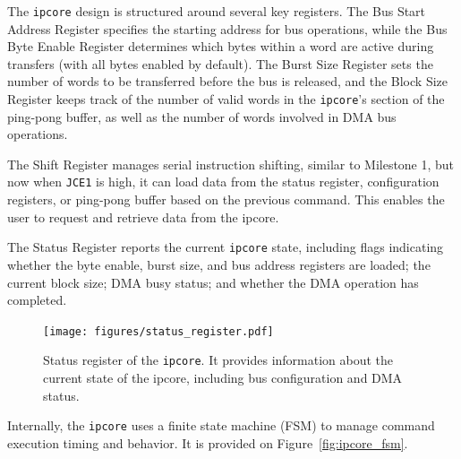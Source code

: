 \documentclass[a4paper,11pt,oneside]{report}
\begin{document}
The \texttt{ipcore} design is structured around several key registers. 
The Bus Start Address Register specifies the starting address for bus operations, 
while the Bus Byte Enable Register determines which bytes within a word are active during transfers 
(with all bytes enabled by default). 
The Burst Size Register sets the number of words to be transferred before the bus is released, 
and the Block Size Register keeps track of the number of valid words in the \texttt{ipcore}'s section of the ping-pong buffer, 
as well as the number of words involved in DMA bus operations.

The Shift Register manages serial instruction shifting, similar to Milestone 1, but now when \texttt{JCE1} is high, it can load data from the status register, configuration registers, or ping-pong buffer based on the previous command.
This enables the user to request and retrieve data from the ipcore.

The Status Register reports the current \texttt{ipcore} state, including flags indicating whether the byte enable, burst size, and bus address registers are loaded; the current block size; DMA busy status; and whether the DMA operation has completed.

\begin{figure}[H]
    \centering
    \texttt{[image: figures/status\_register.pdf]}
    \caption{Status register of the \texttt{ipcore}. It provides information about the current state of the ipcore, including bus configuration and DMA status.}
    \label{fig:status_register}
\end{figure}

Internally, the \texttt{ipcore} uses a finite state machine (FSM) to manage command execution timing and behavior. It is provided on Figure~\ref{fig:ipcore_fsm}.
\end{document}
